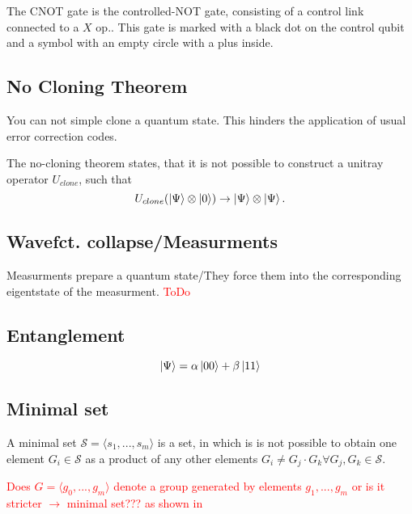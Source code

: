 The CNOT gate is the controlled-NOT gate, consisting of a control link connected to a $X$ op.. 
This gate is marked with a black dot on the control qubit and a symbol with an empty circle with a plus inside.


\subsection{No Cloning Theorem}\label{sec:basic.math.no_cloning_theorem}
You can not simple clone a quantum state. 
This hinders the application of usual error correction codes.

The no-cloning theorem states, that it is not possible to construct a unitray operator $U_{clone}$, such that 
\begin{equation}
    U_{clone} (\ket{\Psi} \otimes \ket{0} ) \rightarrow \ket{\Psi} \otimes \ket{\Psi}.
\end{equation}
\cite{QECintro}


\subsection{Wavefct. collapse/Measurments}\label{sec:basic.math.wavefct_collpase}
Measurments prepare a quantum state/They force them into the corresponding eigentstate of the measurment.
\textcolor{red}{ToDo}


\subsection{Entanglement}
\begin{equation}
    \ket{\Psi} = \alpha \ket{00} + \beta \ket{11}
\end{equation}


\subsection{Minimal set}\label{sec:basic.math.minimal_set}

A minimal set $\mathcal{S}= \langle s_1,...,s_m\rangle$ is a set, 
in which is is not possible to obtain one element $G_i \in \mathcal{S}$ as a product of any other elements  $G_i \ne G_j \cdot G_k \forall G_j,G_k\in\mathcal{S}$.\cite{QECintro}

\textcolor{red}{Does $G = \langle g_0,...,g_m \rangle$ denote a group generated by elements $g_1,...,g_m$ or is it stricter $\rightarrow$ minimal set??? as shown in \cite{QECmemory}}



